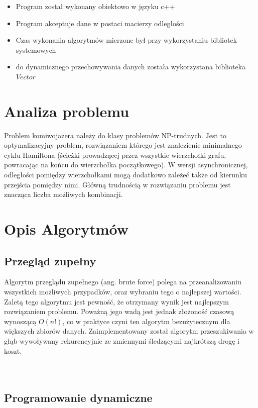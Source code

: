 \documentclass{article}
\begin{document}
\begin{itemize}
\item Program został wykonany obiektowo w języku c++
\item Program akceptuje dane w postaci macierzy odległości
\item Czas wykonania algorytmów mierzone był przy wykorzystaniu bibliotek systemowych
\item do dynamicznego przechowywania danych została wykorzystana biblioteka $Vector$

\end{itemize}

\section{Analiza problemu}

Problem komiwojażera należy do klasy problemów NP-trudnych. Jest to
optymalizacyjny problem, rozwiązaniem którego jest znalezienie minimalnego cyklu Hamiltona
(ścieżki prowadzącej przez wszystkie wierzchołki grafu, powracając na końcu do wierzchołka
początkowego). W wersji asynchronicznej, odległości pomiędzy
wierzchołkami mogą dodatkowo zależeć także od kierunku przejścia pomiędzy nimi. Główną
trudnością w rozwiązaniu problemu jest znacząca liczba możliwych kombinacji.


\section{Opis Algorytmów}

\subsection{Przegląd zupełny}

Algorytm przeglądu zupełnego (ang. brute force) polega na przeanalizowaniu wszystkich
możliwych przypadków, oraz wybraniu tego o najlepszej wartości. Zaletą tego algorytmu jest pewność,
że otrzymany wynik jest najlepszym rozwiązaniem problemu. Poważną jego wadą jest jednak
złożoność czasową wynoszącą $O(n!)$, co w praktyce czyni ten algorytm bezużytecznym dla większych
zbiorów danych. Zaimplementowany został algorytm przeszukiwania w głąb wywoływany rekurencyjnie ze zmiennymi śledzącymi najkrótszą drogę i koszt.\\\\\\

\subsection{Programowanie dynamiczne}
\end{document}
